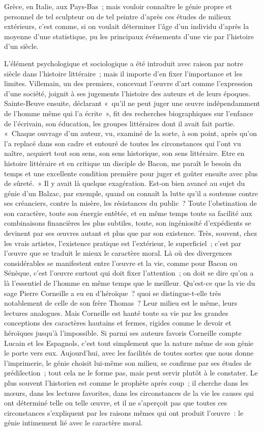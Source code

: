 \documentclass[french,twoside]{book} %
\begin{document}
Grèce, en Italie, aux Pays-Bas ; mais vouloir connaître le génie propre et personnel de tel sculpteur ou de tel peintre d’après ces études de milieux extérieurs, c’est comme, si on voulait déterminer l’âge d’un individu d’après la moyenne d’une statistique, pu les principaux événements d’une vie par l’histoire d’un siècle.\par
L’élément psychologique et sociologique a été introduit avec raison par notre siècle dans l’histoire littéraire ; mais il importe d’en fixer l’importance et les limites. Villemain, un des premiers, concevant l’œuvre d’art comme l’expression d’une société, joignit à ses jugements l’histoire des auteurs et de leurs époques. Sainte-Beuve ensuite, déclarant « qu’il ne peut juger une œuvre indépendamment de l’homme même qui l’a écrite », fit des recherches biographiques sur l’enfance de l’écrivain, son éducation, les groupes littéraires dont il avait fait partie. « Chaque ouvrage d’un auteur, vu, examiné de la sorte, à son point, après qu’on l’a replacé dans son cadre et entouré de toutes les circonstances qui l’ont vu naître, acquiert tout son sens, son sens historique, son sens littéraire. Etre en histoire littéraire et en critique un disciple de Bacon, me paraît le besoin du temps et une excellente condition première pour juger et goûter ensuite avec plus de sûreté. » Il y avait là quelque exagération. Est-on bien avancé au sujet du génie d’un Balzac, par exemple, quand on connaît la lutte qu’il a soutenue contre ses créanciers, contre la misère, les résistances du public ? Toute l’obstination de son caractère, toute son énergie entêtée, et en même temps toute sa facilité aux combinaisons financières les plus subtiles, toute, son ingéniosité d’expédients se devinent par ses œuvres autant et plus que par son existence. Très, souvent, chez les vrais artistes, l’existence pratique est l’extérieur, le superficiel ; c’est par l’œuvre que se traduit le mieux le caractère moral. Là où des divergences considérables se manifestent entre l’œuvre et la vie, comme pour Bacon ou Sénèque, c’est l’œuvre surtout qui doit fixer l’attention ; on doit se dire qu’on a là l’essentiel de l’homme en même temps que le meilleur. Qu’est-ce que la vie du sage Pierre Corneille a eu en d’héroïque ? quoi se distingue-t-elle très notablement de celle de son frère Thomas ? Leur milieu est le même, leurs lectures analogues. Mais Corneille est hanté toute sa vie par les grandes conceptions des caractères hautains et fermes, rigides comme le devoir et héroïques jusqu’à l’impossible. Si parmi ses auteurs favoris Corneille compte Lucain et les Espagnols, c’est tout simplement que la nature même de son génie le porte vers eux. Aujourd’hui, avec les facilités de toutes sortes que nous donne l’imprimerie, le génie choisit lui-même son milieu, se confirme par ses études de prédilection ; tout cela ne le forme pas, mais peut servir plutôt à le constater. Le plus souvent l’historien est comme le prophète après coup ; il cherche dans les mœurs, dans les lectures favorites, dans les circonstances de la vie les causes qui ont déterminé telle ou telle œuvre, et il ne s’aperçoit pas que toutes ces circonstances s’expliquent par les raisons mêmes qui ont produit l’œuvre : le génie intimement lié avec le caractère moral.\par
\end{document}
